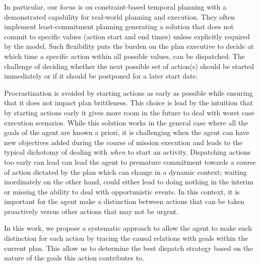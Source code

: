 In particular, our focus is on constraint-based temporal planning
\cite{frank2003} with a demonstrated capability for real-world
planning and execution.
They often implement least-commitment planning generating a solution
that does not commit to specific values (\eg action start and end
times) unless explicitly required by the model. Such flexibility puts
the burden on the plan executive to decide at which time a specific
action within all possible values, can be dispatched. 
The challenge of deciding whether the next possible set of action(s)
should be started immediately or if it should be postponed for a later
start date.

Procrastination is avoided by starting actions as early as possible
while ensuring that it does not impact plan brittleness. This choice
is lead by the intuition that by starting actions early it gives more
room in the future to deal with worst case execution scenarios. While
this solution works in the general case where all the goals of the
agent are known a priori, it is challenging when the agent can have
new objectives added during the course of mission execution and leads
to the typical dichotomy of dealing with \emph{when} to start an
activity. Dispatching actions too early can lead can lead the agent to
premature commitment towards a course of action dictated by the plan
which can change in a dynamic context; waiting inordinately on the
other hand, could either lead to doing nothing in the interim or
missing the ability to deal with opportunistic events.
In this context, it is important for the agent make a distinction
between actions that can be taken proactively versus other actions
that may not be urgent.  

In this work, we propose a systematic approach to allow the agent to
make such distinction for each action by tracing the causal relations
with goals within the current plan.  This allow us to determine the
best dispatch strategy based on the nature of the goals this action
contributes to.

